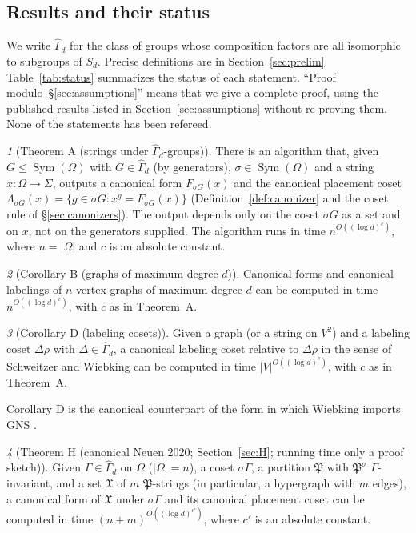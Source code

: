 \documentclass[11pt]{article}
\theoremstyle{plain}
\theoremstyle{definition}
\theoremstyle{remark}
\theoremstyle{named}
\newtheorem*{named}{}
\theoremstyle{namedrm}
\newcommand{\Sym}{\operatorname{Sym}}
\newcommand{\Gd}{\widehat{\Gamma}_d}
\newcommand{\fX}{\mathfrak{X}}
\newcommand{\fP}{\mathfrak{P}}
\begin{document}
\subsection{Results and their status}\label{sec:results}

We write $\Gd$ for the class of groups whose composition factors are all isomorphic to subgroups of
$S_d$. Precise definitions are in Section~\ref{sec:prelim}. Table~\ref{tab:status} summarizes the status
of each statement. ``Proof modulo~\S\ref{sec:assumptions}'' means that we give a complete proof, using
the published results listed in Section~\ref{sec:assumptions} without re-proving them. None of the
statements has been refereed.

\begin{named}[Theorem A (strings under $\Gd$-groups)]
There is an algorithm that, given $G\le\Sym(\Omega)$ with $G\in\Gd$ (by generators), $\sigma\in\Sym(\Omega)$
and a string $x\colon\Omega\to\Sigma$, outputs a canonical form $F_{\sigma G}(x)$ and the canonical
placement coset $\Lambda_{\sigma G}(x)=\{g\in\sigma G: x^g=F_{\sigma G}(x)\}$ (Definition~\ref{def:canonizer}
and the coset rule of \S\ref{sec:canonizers}).
The output depends only on the coset $\sigma G$ as a set and on $x$, not on the generators supplied.
The algorithm runs in time $n^{O((\log d)^c)}$, where $n=|\Omega|$ and $c$ is an absolute constant.
\end{named}

\begin{named}[Corollary B (graphs of maximum degree $d$)]
Canonical forms and canonical labelings of $n$-vertex graphs of maximum degree $d$ can be computed in
time $n^{O((\log d)^c)}$, with $c$ as in Theorem~A.
\end{named}

\begin{named}[Corollary D (labeling cosets)]
Given a graph (or a string on $V^2$) and a labeling coset $\Delta\rho$ with $\Delta\in\Gd$, a canonical
labeling coset relative to $\Delta\rho$ in the sense of Schweitzer and Wiebking can be computed in time
$|V|^{O((\log d)^c)}$, with $c$ as in Theorem~A.
\end{named}

Corollary D is the canonical counterpart of the form in which Wiebking imports GNS
\cite[Thm.~31]{Wie20}.

\begin{named}[Theorem H (canonical Neuen 2020; Section~\ref{sec:H}; running time only a proof sketch)]
Given $\Gamma\in\Gd$ on $\Omega$ ($|\Omega|=n$), a coset $\sigma\Gamma$, a partition $\fP$ with
$\fP^\sigma$ $\Gamma$-invariant, and a set $\fX$ of $m$ $\fP$-strings (in particular, a hypergraph with
$m$ edges), a canonical form of $\fX$ under $\sigma\Gamma$ and its canonical placement coset can be
computed in time $(n+m)^{O((\log d)^{c'})}$, where $c'$ is an absolute constant.
\end{named}
\end{document}
